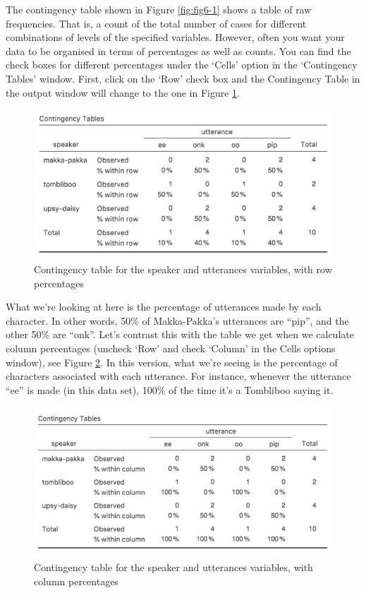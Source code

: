 \documentclass[
]{book}
\begin{document}
The contingency table shown in Figure \ref{fig:fig6-1} shows a table of raw frequencies. That is, a count of the total number of cases for different combinations of levels of the specified variables. However, often you want your data to be organised in terms of percentages as well as counts. You can find the check boxes for different percentages under the `Cells' option in the `Contingency Tables' window. First, click on the `Row' check box and the Contingency Table in the output window will change to the one in Figure \ref{fig:fig6-2}.

\begin{figure}
\includegraphics[width=0.9\linewidth]{images/Figure34} \caption{Contingency table for the speaker and utterances variables, with row percentages}\label{fig:fig6-2}
\end{figure}

What we're looking at here is the percentage of utterances made by each character. In other words, 50\% of Makka-Pakka's utterances are ``pip'', and the other 50\% are ``onk''. Let's contrast this with the table we get when we calculate column percentages (uncheck `Row' and check `Column' in the Cells options window), see Figure \ref{fig:fig6-3}. In this version, what we're seeing is the percentage of characters associated with each utterance. For instance, whenever the utterance ``ee'' is made (in this data set), 100\% of the time it's a Tombliboo saying it.

\begin{figure}
\includegraphics[width=0.9\linewidth]{images/Figure35} \caption{Contingency table for the speaker and utterances variables, with column percentages}\label{fig:fig6-3}
\end{figure}
\end{document}
